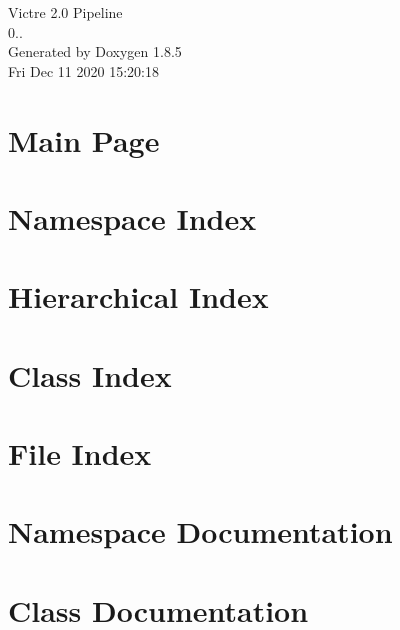 \documentclass[twoside]{book}
\newcommand{\clearemptydoublepage}{%
  \newpage{\pagestyle{empty}\cleardoublepage}%
}
\begin{document}
\hypersetup{pageanchor=false}
\begin{titlepage}
\vspace*{7cm}
\begin{center}%
{\Large Victre 2.0 Pipeline \\[1ex]\large 0.. }\\
\vspace*{1cm}
{\large Generated by Doxygen 1.8.5}\\
\vspace*{0.5cm}
{\small Fri Dec 11 2020 15:20:18}\\
\end{center}
\end{titlepage}
\clearemptydoublepage
\tableofcontents
\clearemptydoublepage
{}
\hypersetup{pageanchor=true}

\chapter{Main Page}
\label{index}\hypertarget{index}{}
\chapter{Namespace Index}

\chapter{Hierarchical Index}

\chapter{Class Index}

\chapter{File Index}

\chapter{Namespace Documentation}










\chapter{Class Documentation}



\end{document}
